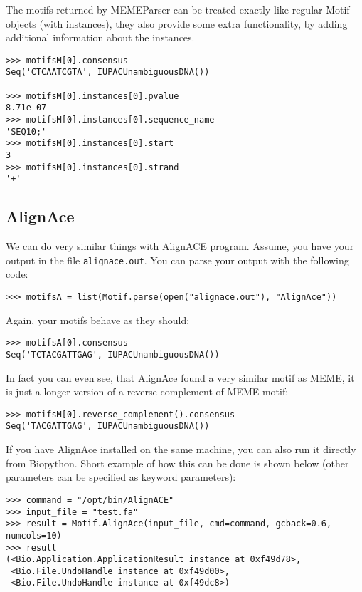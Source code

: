 \documentclass{article}
\begin{document}
The motifs returned by MEMEParser can be treated exactly like regular
Motif objects (with instances), they also provide some extra
functionality, by adding additional information about the instances. 

\begin{verbatim}
>>> motifsM[0].consensus
Seq('CTCAATCGTA', IUPACUnambiguousDNA())

>>> motifsM[0].instances[0].pvalue
8.71e-07
>>> motifsM[0].instances[0].sequence_name
'SEQ10;'
>>> motifsM[0].instances[0].start
3
>>> motifsM[0].instances[0].strand
'+'
\end{verbatim}


\subsection{AlignAce}
\label{sec:alignace}

We can do very similar things with AlignACE program. Assume, you have
your output in the file \verb|alignace.out|. You can parse your output
with the following code:

\begin{verbatim}
>>> motifsA = list(Motif.parse(open("alignace.out"), "AlignAce"))
\end{verbatim}

Again, your motifs behave as they should:
\begin{verbatim}
>>> motifsA[0].consensus
Seq('TCTACGATTGAG', IUPACUnambiguousDNA())
\end{verbatim}

In fact you can even see, that AlignAce found a very similar motif as
MEME, it is just a longer version of a reverse complement of MEME
motif:
\begin{verbatim}
>>> motifsM[0].reverse_complement().consensus
Seq('TACGATTGAG', IUPACUnambiguousDNA())
\end{verbatim}

If you have AlignAce installed on the same machine, you can also run
it directly from Biopython. Short example of how this can be done is
shown below (other parameters can be specified as keyword parameters):

\begin{verbatim}
>>> command = "/opt/bin/AlignACE"
>>> input_file = "test.fa"
>>> result = Motif.AlignAce(input_file, cmd=command, gcback=0.6, numcols=10)
>>> result
(<Bio.Application.ApplicationResult instance at 0xf49d78>,
 <Bio.File.UndoHandle instance at 0xf49d00>,
 <Bio.File.UndoHandle instance at 0xf49dc8>)
\end{verbatim}
\end{document}

